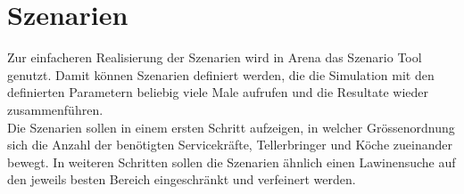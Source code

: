\documentclass[ngerman,a4paper,12pt]{scrreprt}
\begin{document}
			
	\section{Szenarien}
		Zur einfacheren Realisierung der Szenarien wird in Arena das Szenario Tool genutzt. Damit können Szenarien definiert werden, die die Simulation mit den definierten Parametern beliebig viele Male aufrufen und die Resultate wieder zusammenführen. \\
		
		Die Szenarien sollen in einem ersten Schritt aufzeigen, in welcher Grössenordnung sich die Anzahl der benötigten Servicekräfte, Tellerbringer und Köche zueinander bewegt. In weiteren Schritten sollen die Szenarien ähnlich einen Lawinensuche auf den jeweils besten Bereich eingeschränkt und verfeinert werden.
			
			
\end{document}
